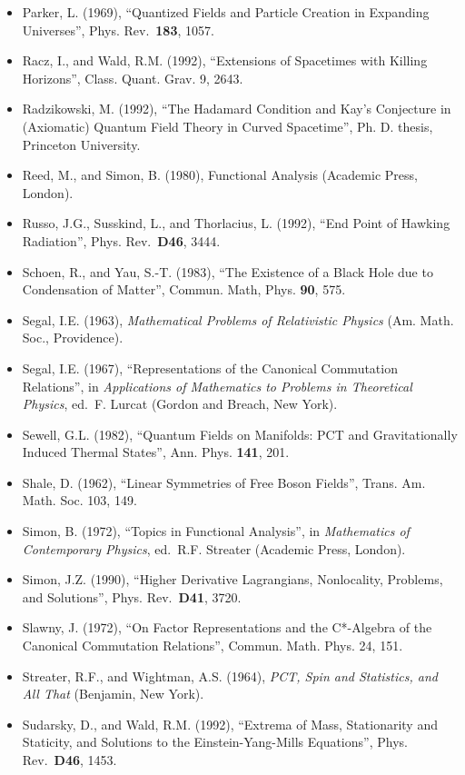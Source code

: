 \documentclass[11pt,a4paper]{article}
\providecommand{\tightlist}{\setlength{\itemsep}{0pt}\setlength{\parskip}{0pt}}
\begin{document}
\begin{itemize}
\tightlist
\item
  Parker, L. (1969), ``Quantized Fields and Particle Creation in Expanding Universes'', Phys. Rev.~\textbf{183}, 1057.
\item
  Racz, I., and Wald, R.M. (1992), ``Extensions of Spacetimes with Killing Horizons'', Class. Quant. Grav. 9, 2643.
\item
  Radzikowski, M. (1992), ``The Hadamard Condition and Kay's Conjecture in (Axiomatic) Quantum Field Theory in Curved Spacetime'', Ph. D. thesis, Princeton University.
\item
  Reed, M., and Simon, B. (1980), Functional Analysis (Academic Press, London).
\item
  Russo, J.G., Susskind, L., and Thorlacius, L. (1992), ``End Point of Hawking Radiation'', Phys. Rev.~\textbf{D46}, 3444.
\item
  Schoen, R., and Yau, S.-T. (1983), ``The Existence of a Black Hole due to Condensation of Matter'', Commun. Math, Phys. \textbf{90}, 575.
\item
  Segal, I.E. (1963), \emph{Mathematical Problems of Relativistic Physics} (Am. Math. Soc., Providence).
\item
  Segal, I.E. (1967), ``Representations of the Canonical Commutation Relations'', in \emph{Applications of Mathematics to Problems in Theoretical Physics}, ed.~F. Lurcat (Gordon and Breach, New York).
\item
  Sewell, G.L. (1982), ``Quantum Fields on Manifolds: PCT and Gravitationally Induced Thermal States'', Ann. Phys. \textbf{141}, 201.
\item
  Shale, D. (1962), ``Linear Symmetries of Free Boson Fields'', Trans. Am. Math. Soc. 103, 149.
\item
  Simon, B. (1972), ``Topics in Functional Analysis'', in \emph{Mathematics of Contemporary Physics}, ed.~R.F. Streater (Academic Press, London).
\item
  Simon, J.Z. (1990), ``Higher Derivative Lagrangians, Nonlocality, Problems, and Solutions'', Phys. Rev.~\textbf{D41}, 3720.
\item
  Slawny, J. (1972), ``On Factor Representations and the C*-Algebra of the Canonical Commutation Relations'', Commun. Math. Phys. 24, 151.
\item
  Streater, R.F., and Wightman, A.S. (1964), \emph{PCT, Spin and Statistics, and All That} (Benjamin, New York).
\item
  Sudarsky, D., and Wald, R.M. (1992), ``Extrema of Mass, Stationarity and Staticity, and Solutions to the Einstein-Yang-Mills Equations'', Phys. Rev.~\textbf{D46}, 1453.

\end{itemize}
\end{document}
